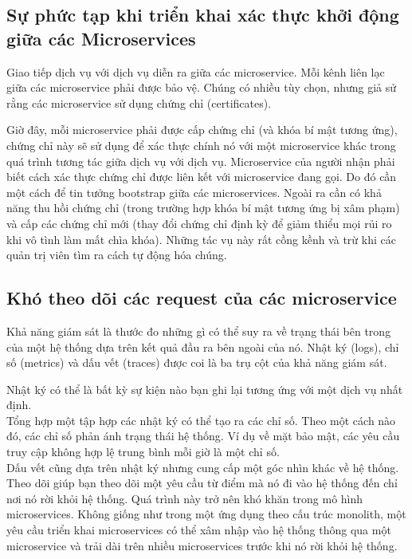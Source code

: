\documentclass[14pt,a4paper]{report}
\begin{document}
	\subsection{Sự phức tạp khi triển khai xác thực khởi động giữa các Microservices}
	{\hspace{1cm}Giao tiếp dịch vụ với dịch vụ diễn ra giữa các microservice. Mỗi kênh liên lạc giữa các microservice phải được bảo vệ. Chúng có nhiều tùy chọn, nhưng giả sử rằng các microservice sử dụng chứng chỉ (certificates).\\}
	
	\hspace{0.3cm}Giờ đây, mỗi microservice phải được cấp chứng chỉ (và khóa bí mật tương ứng), chứng chỉ này sẽ sử dụng để xác thực chính nó với một microservice khác trong quá trình tương tác giữa dịch vụ với dịch vụ. Microservice của người nhận phải biết cách xác thực chứng chỉ được liên kết với microservice đang gọi. Do đó cần một cách để tin tưởng bootstrap giữa các microservices. Ngoài ra cần có khả năng thu hồi chứng chỉ (trong trường hợp khóa bí mật tương ứng bị xâm phạm) và cấp các chứng chỉ mới (thay đổi chứng chỉ định kỳ để giảm thiểu mọi rủi ro khi vô tình làm mất chìa khóa). Những tác vụ này rất cồng kềnh và trừ khi các quản trị viên tìm ra cách tự động hóa chúng.\\
	\subsection{Khó theo dõi các request của các microservice}
	{\hspace{1cm}Khả năng giám sát là thước đo những gì có thể suy ra về trạng thái bên trong của một hệ thống dựa trên kết quả đầu ra bên ngoài của nó. Nhật ký (logs), chỉ số (metrics) và dấu vết (traces) được coi là ba trụ cột của khả năng giám sát.\\}
	
	\hspace{0.3cm}Nhật ký có thể là bất kỳ sự kiện nào bạn ghi lại tương ứng với một dịch vụ nhất định.\\
	
	\hspace{0.3cm}Tổng hợp một tập hợp các nhật ký có thể tạo ra các chỉ số. Theo một cách nào đó, các chỉ số phản ánh trạng thái hệ thống. Ví dụ về mặt bảo mật, các yêu cầu truy cập không hợp lệ trung bình mỗi giờ là một chỉ số.\\
	
	\hspace{0.3cm}Dấu vết cũng dựa trên nhật ký nhưng cung cấp một góc nhìn khác về hệ thống. Theo dõi giúp bạn theo dõi một yêu cầu từ điểm mà nó đi vào hệ thống đến chỉ nơi nó rời khỏi hệ thống. Quá trình này trở nên khó khăn trong mô hình microservices. Không giống như trong một ứng dụng theo cấu trúc monolith, một yêu cầu triển khai microservices có thể xâm nhập vào hệ thống thông qua một microservice và trải dài trên nhiều microservices trước khi nó rời khỏi hệ thống.			
\end{document}
